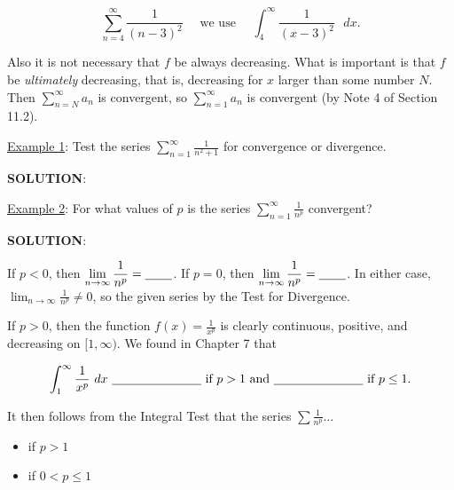 \documentclass[paper=a4, fontsize=11pt]{scrartcl} %
\numberwithin{equation}{section} %
\numberwithin{figure}{section} %
\numberwithin{table}{section} %
\newcommand{\ds}{\displaystyle}
\begin{document}
  \[\ds\sum_{n=4}^\infty \ds\frac{1}{(n-3)^2} \quad \text{ we use } \quad \ds\int_4^\infty \ds\frac{1}{(x-3)^2}\text{ }dx.\]
  
  Also it is not necessary that $f$ be always decreasing. What is important is that $f$ be \textit{ultimately} decreasing, that is, decreasing for $x$ larger than some number $N$. Then $\ds\sum_{n=N}^\infty a_n$ is convergent, so $\ds\sum_{n=1}^\infty a_n$ is convergent (by Note 4 of Section 11.2).\\
  \indent
  
  
  \underline{Example 1}: Test the series $\ds\sum_{n=1}^\infty \ds\frac{1}{n^2+1}$ for convergence or divergence.\\
  \indent
  
  \textbf{SOLUTION}:\\
  \indent
  
  \vspace{4in}
  
  \underline{Example 2}: For what values of $p$ is the series $\ds\sum_{n=1}^\infty \ds\frac{1}{n^p}$ convergent?\\
  \indent
  
  \textbf{SOLUTION}: \\
  \indent
  
  If $p<0$, then $\ds\lim_{n\to\infty}\ds\frac{1}{n^p} = \underline{\hspace{0.3in}}$. If $p=0$, then $\ds\lim_{n\to\infty}\ds\frac{1}{n^p} = \underline{\hspace{0.3in}}$. In either case, $\ds\lim_{n\to\infty}\ds\frac{1}{n^p}\neq 0$, so the given series \underline{\hspace{1in}} by the Test for Divergence.\\
  \indent
  
  If $p>0$, then the function $f(x)=\ds\frac{1}{x^p}$ is clearly continuous, positive, and decreasing on $[1,\infty)$. We found in Chapter 7 that
  
  \[\ds\int_1^\infty \ds\frac{1}{x^p}\text{ }dx \text{ \underline{\hspace{1in}}  if } p>1 \text{ and \underline{\hspace{1in}}  if } p\leq 1.\]
  \indent
  
  It then follows from the Integral Test that the series $\ds\sum \ds\frac{1}{n^p}\ldots$
  \begin{itemize}
  \item \underline{\hspace{1in}}  if $p>1$\\
  \item \underline{\hspace{1in}}  if  $0<p\leq 1$
  \end{itemize}
  
\end{document}
